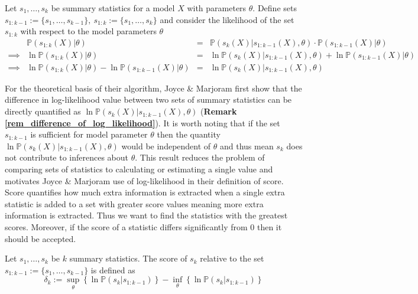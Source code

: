 \documentclass[bibliography=totoc,11pt,a4paper,margin=0]{article}
\newcommand*{\prob}{\mathbb{P}}
\theoremstyle{break}
\begin{document}
  \begin{box_remark}\label{rem_difference_of_log_likelihood}
    Let $s_1,\dots,s_k$ be summary statistics for a model $X$ with parameters $\theta$. Define sets $s_{1:k-1}:=\{s_1,\dots,s_{k-1}\},\ s_{1:k}:=\{s_1,\dots,s_k\}$ and consider the likelihood of the set $s_{1:k}$ with respect to the model parameters $\theta$
    \[\begin{array}{rrcl}
    &\prob(s_{1:k}(X)|\theta)&=&\prob(s_k(X)|s_{1:k-1}(X),\theta)\cdot\prob(s_{1:k-1}(X)|\theta)\\
    \implies&\ln\prob(s_{1:k}(X)|\theta)&=&\ln\prob(s_k(X)|s_{1:k-1}(X),\theta)+\ln\prob(s_{1:k-1}(X)|\theta)\\
    \implies&\ln\prob(s_{1:k}(X)|\theta)-\ln\prob(s_{1:k-1}(X)|\theta)&=&\ln\prob(s_k(X)|s_{1:k-1}(X),\theta)
    \end{array}\]
  \end{box_remark}

  \par For the theoretical basis of their algorithm, Joyce \& Marjoram first show that the difference in log-likelihood value between two sets of summary statistics can be directly quantified as $\ln\prob(s_k(X)|s_{1:k-1}(X),\theta)$ (\textbf{Remark \ref{rem_difference_of_log_likelihood}}). It is worth noting that if the set $s_{1:k-1}$ is sufficient for model parameter $\theta$ then the quantity $\ln\prob(s_k(X)|s_{1:k-1}(X),\theta)$ would be independent of $\theta$ and thus mean $s_k$ does not contribute to inferences about $\theta$. This result reduces the problem of comparing sets of statistics to calculating or estimating a single value and motivates Joyce \& Marjoram use of log-likelihood in their definition of score. Score quantifies how much extra information is extracted when a single extra statistic is added to a set with greater score values meaning more extra information is extracted. Thus we want to find the statistics with the greatest scores. Moreover, if the score of a statistic differs significantly from 0 then it should be accepted.

  \begin{box_definition}\label{def_score}
    Let $s_1,\dots,s_k$ be $k$ summary statistics. The score of $s_k$ relative to the set $s_{1:k-1}:=\{s_1,\dots,s_{k-1}\}$ is defined as
    \[ \delta_k:=\sup_\theta\left\{\ln\prob(s_k|s_{1:k-1})\right\}-\inf_\theta\left\{\ln\prob(s_k|s_{1:k-1})\right\} \]
  \end{box_definition}
\end{document}
